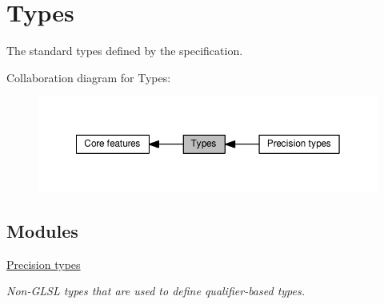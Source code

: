 \hypertarget{group__core__types}{}\section{Types}
\label{group__core__types}


The standard types defined by the specification.  


Collaboration diagram for Types\+:
\nopagebreak
\begin{figure}[H]
\begin{center}
\leavevmode
\includegraphics[width=350pt]{db/dac/group__core__types}
\end{center}
\end{figure}
\subsection*{Modules}
\begin{DoxyCompactItemize}
\item 
\hyperlink{group__core__precision}{Precision types}
\begin{DoxyCompactList}\small\item\em Non-\/\+G\+L\+SL types that are used to define qualifier-\/based types. \end{DoxyCompactList}\end{DoxyCompactItemize}
